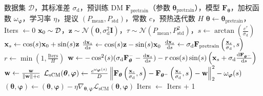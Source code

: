 \begin{algorithm}[tb]
{\small
\caption{连续时间一致性模型 (sCM) 的训练 \label{alg:scm}}
\begin{algorithmic}[1]
\Require 数据集 $\mathcal{D}$，其标准差 $\sigma_{\mathrm{d}}$，预训练 DM $\mathbf{F}_{\text{pretrain}}$（参数 $\bm{\theta}_{\text{pretrain}}$），模型 $\mathbf{F}_{\bm{\theta}}$，加权函数 $\omega_{\boldsymbol{\varphi}}$，学习率 $\eta$，提议 $(P_{\text{mean}}, P_{\text{std}})$，常数 $c$，预热迭代数 $H$
\State {} $\bm{\theta} \gets \bm{\theta}_{\text{pretrain}}$，Iters $\gets 0$
\Repeat
    \State ${\mathbf{x}}_0 \sim \mathcal{D}$，$\mathbf{z} \sim \mathcal{N}(\bm{0}, \sigma_{\mathrm{d}}^2 \mathbf{I})$，$\tau \sim \mathcal{N}(P_{\text{mean}}, P_{\text{std}}^2)$，$s \gets \arctan\left(\frac{e^\tau}{\sigma_{\mathrm{d}}}\right)$
    \State ${\mathbf{x}}_s \gets \cos(s) {\mathbf{x}}_0 + \sin(s) \mathbf{z}$
        \State $\frac{\mathop{}\!\mathrm{d}{\mathbf{x}}_s}{\mathop{}\!\mathrm{d} s} \gets \cos(s) \mathbf{z} - \sin(s) {\mathbf{x}}_0$
    \Else
        \State $\frac{\mathop{}\!\mathrm{d}{\mathbf{x}}_s}{\mathop{}\!\mathrm{d} s} \gets \sigma_{\mathrm{d}} \mathbf{F}_{\text{pretrain}}\left(\frac{{\mathbf{x}}_s}{\sigma_{\mathrm{d}}}, s\right)$
    \EndIf
    \State $r \gets \min\left(1, \frac{\text{Iters}}{H}\right)$ \hfill {}
    \State ${\mathbf{w}} \gets - \cos^2(s) (\sigma_{\mathrm{d}} \mathbf{F}_{\bm{\theta}}^{-} - \frac{\mathop{}\!\mathrm{d}{\mathbf{x}}_s}{\mathop{}\!\mathrm{d} s}) - r  \cos(s) \sin(s) \left({\mathbf{x}}_s + \sigma_{\mathrm{d}} \frac{\mathop{}\!\mathrm{d}\mathbf{F}_{\bm{\theta}^-}}{\mathop{}\!\mathrm{d} s}\right)$
    \State ${\mathbf{w}} \gets \frac{{\mathbf{w}}}{\|{\mathbf{w}}\| + c}$ \hfill {}
    \State $\mathcal{L}_{\text{sCM}}(\bm{\theta}, \boldsymbol{\varphi}) \gets\frac{e^{\omega_{\boldsymbol{\varphi}}(s)}}{D} \left\lVert \mathbf{F}_{\bm{\theta}}\left( \frac{{\mathbf{x}}_s}{\sigma_{\mathrm{d}}}, s\right) - \mathbf{F}_{\bm{\theta}^{-}}\left( \frac{{\mathbf{x}}_s}{\sigma_{\mathrm{d}}}, s\right) - {\mathbf{w}} \right\rVert^2_2 - \omega_{\boldsymbol{\varphi}}(s)$
    \Statex  \hfill {}
    \State $(\bm{\theta}, \boldsymbol{\varphi}) \gets (\bm{\theta}, \boldsymbol{\varphi}) - \eta \nabla_{\bm{\theta}, \boldsymbol{\varphi}} \mathcal{L}_{\text{sCM}}(\bm{\theta}, \boldsymbol{\varphi})$
    \State Iters $\gets$ Iters + 1
\end{algorithmic}
}
\end{algorithm}








